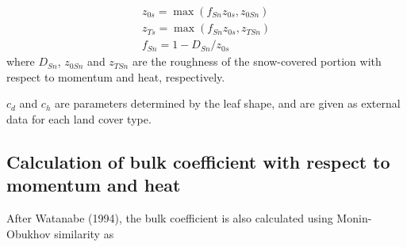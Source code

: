 \begin{eqnarray}
 z_{0s} = \max( f_{Sn} z_{0s}, z_{0Sn} ) \\
 z_{Ts} = \max( f_{Sn} z_{0s}, z_{TSn} ) \\
          f_{Sn} = 1 - D_{Sn} / z_{0s}
\end{eqnarray} where \(D_{Sn}\), \(z_{0Sn}\) and \(z_{TSn}\) are the roughness of the snow-covered portion with respect to momentum and heat, respectively.

\(c_d\) and \(c_h\) are parameters determined by the leaf shape, and are given as external data for each land cover type.

\hypertarget{calculation-of-bulk-coefficient-with-respect-to-momentum-and-heat}{%
\subsection{Calculation of bulk coefficient with respect to momentum and heat}\label{calculation-of-bulk-coefficient-with-respect-to-momentum-and-heat}}

After Watanabe (1994), the bulk coefficient is also calculated using Monin-Obukhov similarity as

